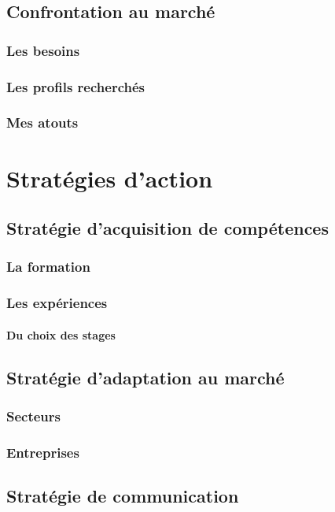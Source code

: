 \documentclass[a4paper]{report}
\begin{document}
\chapter{Confrontation au marché}
\section{Les besoins}
\section{Les profils recherchés}
\section{Mes atouts}

\part{Stratégies d'action}

\chapter{Stratégie d'acquisition de compétences}
\section{La formation}
\section{Les expériences}
\subsection{Du choix des stages}

\chapter{Stratégie d'adaptation au marché}
\section{Secteurs}
\section{Entreprises}

\chapter{Stratégie de communication}
\end{document}
